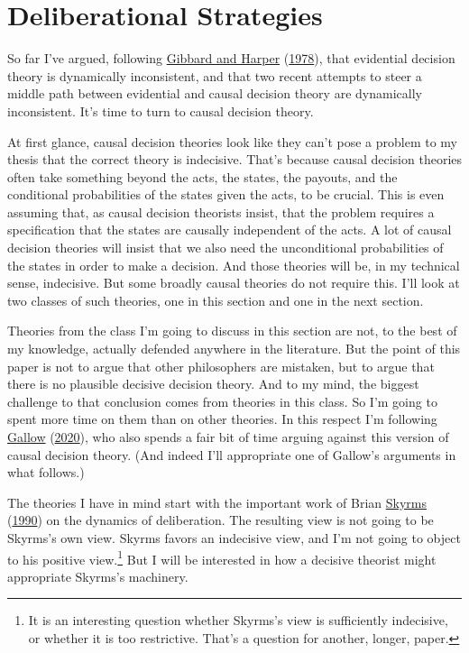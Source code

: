 \documentclass[
  12pt,
]{article}
\begin{document}
\hypertarget{deliberational-strategies}{%
\section{Deliberational Strategies}\label{deliberational-strategies}}

So far I've argued, following
\protect\hyperlink{ref-GibbardHarper1978}{Gibbard and Harper}
(\protect\hyperlink{ref-GibbardHarper1978}{1978}), that evidential
decision theory is dynamically inconsistent, and that two recent
attempts to steer a middle path between evidential and causal decision
theory are dynamically inconsistent. It's time to turn to causal
decision theory.

At first glance, causal decision theories look like they can't pose a
problem to my thesis that the correct theory is indecisive. That's
because causal decision theories often take something beyond the acts,
the states, the payouts, and the conditional probabilities of the states
given the acts, to be crucial. This is even assuming that, as causal
decision theorists insist, that the problem requires a specification
that the states are causally independent of the acts. A lot of causal
decision theories will insist that we also need the unconditional
probabilities of the states in order to make a decision. And those
theories will be, in my technical sense, indecisive. But some broadly
causal theories do not require this. I'll look at two classes of such
theories, one in this section and one in the next section.

Theories from the class I'm going to discuss in this section are not, to
the best of my knowledge, actually defended anywhere in the literature.
But the point of this paper is not to argue that other philosophers are
mistaken, but to argue that there is no plausible decisive decision
theory. And to my mind, the biggest challenge to that conclusion comes
from theories in this class. So I'm going to spent more time on them
than on other theories. In this respect I'm following
\protect\hyperlink{ref-Gallow2020}{Gallow}
(\protect\hyperlink{ref-Gallow2020}{2020}), who also spends a fair bit
of time arguing against this version of causal decision theory. (And
indeed I'll appropriate one of Gallow's arguments in what follows.)

The theories I have in mind start with the important work of Brian
\protect\hyperlink{ref-Skyrms1990}{Skyrms}
(\protect\hyperlink{ref-Skyrms1990}{1990}) on the dynamics of
deliberation. The resulting view is not going to be Skyrms's own view.
Skyrms favors an indecisive view, and I'm not going to object to his
positive view.\footnote{It is an interesting question whether Skyrms's
  view is sufficiently indecisive, or whether it is too restrictive.
  That's a question for another, longer, paper.} But I will be
interested in how a decisive theorist might appropriate Skyrms's
machinery.
\end{document}
